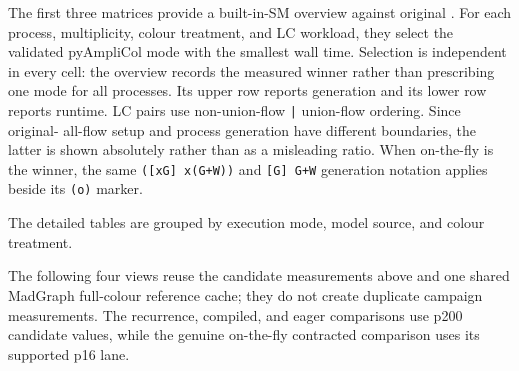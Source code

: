 The first three matrices provide a built-in-SM overview against original
\AC{}.  For each process, multiplicity, colour treatment, and LC workload,
they select the validated pyAmpliCol mode with the smallest wall time.
Selection is independent in every cell: the overview records the measured
winner rather than prescribing one mode for all processes.  Its upper row
reports generation and its lower row reports runtime.  LC pairs use
non-union-flow \texttt{|} union-flow ordering.  Since original-\AC{} all-flow
setup and \PAC{} process generation have different boundaries, the latter is
shown absolutely rather than as a misleading ratio. When on-the-fly is the
winner, the same \texttt{([xG] x(G+W))} and \texttt{[G] G+W} generation
notation applies beside its \texttt{(o)} marker.





The detailed tables are grouped by execution mode, model source, and colour
treatment.

















The following four views reuse the candidate measurements above and one shared
MadGraph full-colour reference cache; they do not create duplicate campaign
measurements. The recurrence, compiled, and eager comparisons use p200
candidate values, while the genuine on-the-fly contracted comparison uses its
supported p16 lane.





